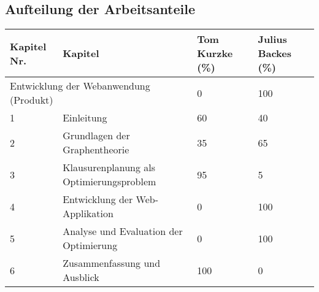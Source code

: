 \newpage
\subsection*{Aufteilung der Arbeitsanteile}

\begin{longtable}{|p{3cm}|p{4cm}|p{4cm}|p{4cm}|}
\hline
\textbf{Kapitel Nr.} & \textbf{Kapitel} & \textbf{Tom Kurzke (\%)} & \textbf{Julius Backes (\%)} \\
\hline
\multicolumn{2}{|p{7cm}|}{Entwicklung der Webanwendung (Produkt)} & 0 & 100\\
\hline
1 & Einleitung & 60 & 40 \\
\hline
2 & Grundlagen der Graphentheorie & 35 & 65 \\
\hline
3 & Klausurenplanung als Optimierungsproblem & 95 & 5 \\
\hline
4 & Entwicklung der Web-Applikation & 0 & 100 \\
\hline
5 & Analyse und Evaluation der Optimierung & 0 & 100 \\
\hline
6 & Zusammenfassung und Ausblick & 100 & 0 \\
\hline
\end{longtable}